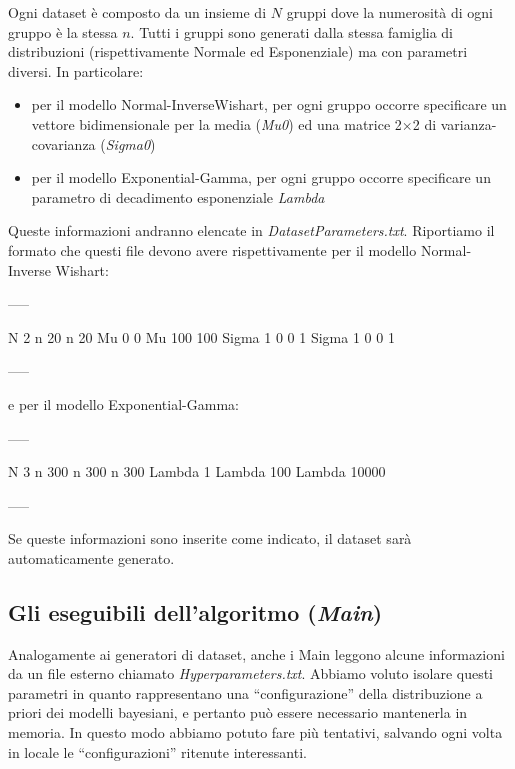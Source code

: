\documentclass[a4paper,12pt]{report}							%
\begin{document}
Ogni dataset è composto da un insieme di $N$ gruppi dove la numerosità di ogni gruppo è la stessa $n$.
Tutti i gruppi sono generati dalla stessa famiglia di distribuzioni (rispettivamente
Normale ed Esponenziale) ma con parametri diversi. In particolare:
\begin{itemize}
 \item per il modello Normal-InverseWishart, per ogni gruppo occorre specificare un vettore bidimensionale per la media 
 (\textit{Mu0}) ed una matrice
 2$\times$2 di varianza-covarianza (\textit{Sigma0})
 \item per il modello Exponential-Gamma, per ogni gruppo occorre specificare un parametro di decadimento esponenziale \textit{Lambda}
\end{itemize}
Queste informazioni andranno elencate in \textit{DatasetParameters.txt}. Riportiamo il formato che questi file devono 
avere rispettivamente per il modello Normal-Inverse Wishart:
\begin{center}
 -----
\end{center}
\begin{code}
N
2
n
20
n
20
Mu
0
0
Mu
100
100
Sigma
1 0
0 1
Sigma
1 0
0 1
\end{code}
\begin{center}
 -----
\end{center}
e per il modello Exponential-Gamma:
\begin{center}
 -----
\end{center}
\begin{code}
N
3
n
300
n
300
n
300
Lambda
1
Lambda
100
Lambda
10000
\end{code}
\begin{center}
 -----
\end{center}
Se queste informazioni sono inserite come indicato, il dataset sarà automaticamente generato.

\subsection{Gli eseguibili dell'algoritmo (\textit{Main})}
Analogamente ai generatori di dataset, anche i Main leggono alcune informazioni da un file esterno chiamato 
\textit{Hyperparameters.txt}. 
Abbiamo voluto isolare questi parametri in quanto rappresentano una ``configurazione'' della distribuzione a priori dei 
modelli bayesiani, e pertanto può essere necessario mantenerla in memoria. In questo modo abbiamo potuto fare più tentativi, 
salvando ogni volta in locale le ``configurazioni'' ritenute interessanti.
\end{document}
